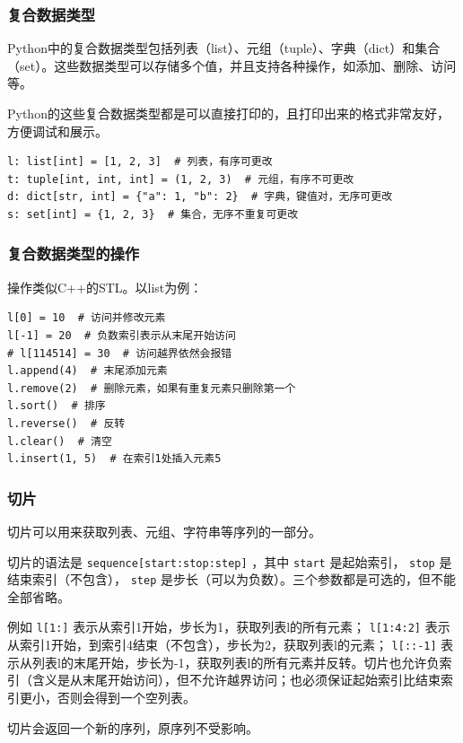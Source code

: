 \begin{frame}[fragile]
    \frametitle{复合数据类型}
    Python中的复合数据类型包括列表（list）、元组（tuple）、字典（dict）和集合（set）。这些数据类型可以存储多个值，并且支持各种操作，如添加、删除、访问等。

    Python的这些复合数据类型都是可以直接打印的，且打印出来的格式非常友好，方便调试和展示。

    \begin{verbatim}
l: list[int] = [1, 2, 3]  # 列表，有序可更改
t: tuple[int, int, int] = (1, 2, 3)  # 元组，有序不可更改
d: dict[str, int] = {"a": 1, "b": 2}  # 字典，键值对，无序可更改
s: set[int] = {1, 2, 3}  # 集合，无序不重复可更改
    \end{verbatim}

\end{frame}

\begin{frame}[fragile]
    \frametitle{复合数据类型的操作}

    操作类似C++的STL。以list为例：
    \begin{verbatim}
l[0] = 10  # 访问并修改元素
l[-1] = 20  # 负数索引表示从末尾开始访问
# l[114514] = 30  # 访问越界依然会报错
l.append(4)  # 末尾添加元素
l.remove(2)  # 删除元素，如果有重复元素只删除第一个
l.sort()  # 排序
l.reverse()  # 反转
l.clear()  # 清空
l.insert(1, 5)  # 在索引1处插入元素5
    \end{verbatim}

\end{frame}

\begin{frame}[fragile]
    \frametitle{切片}

    切片可以用来获取列表、元组、字符串等序列的一部分。
    
    切片的语法是 \texttt{sequence[start:stop:step]} ，其中 \texttt{start} 是起始索引， \texttt{stop} 是结束索引（不包含）， \texttt{step} 是步长（可以为负数）。三个参数都是可选的，但不能全部省略。

    例如 \texttt{l[1:]} 表示从索引1开始，步长为1，获取列表l的所有元素； \texttt{l[1:4:2]} 表示从索引1开始，到索引4结束（不包含），步长为2，获取列表l的元素； \texttt{l[::-1]} 表示从列表l的末尾开始，步长为-1，获取列表l的所有元素并反转。切片也允许负索引（含义是从末尾开始访问），但不允许越界访问；也必须保证起始索引比结束索引更小，否则会得到一个空列表。

    切片会返回一个新的序列，原序列不受影响。

\end{frame}

